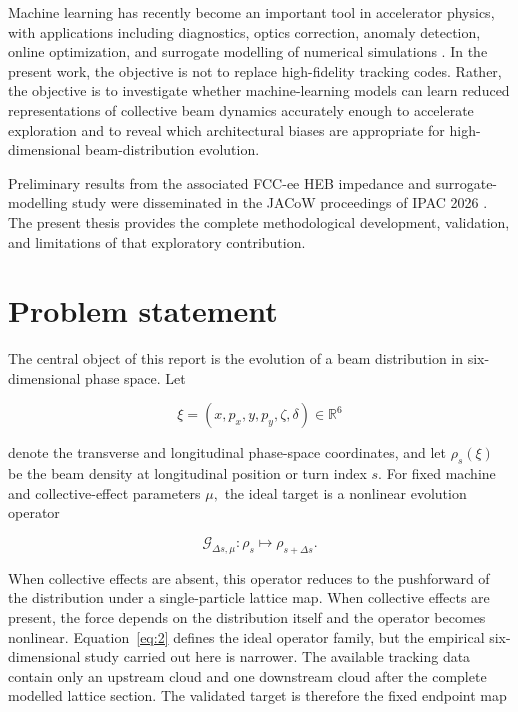 Machine learning has recently become an important tool in accelerator physics, with applications including diagnostics, optics correction, anomaly detection, online optimization, and surrogate modelling of numerical simulations \cite{arpaia2021machine,roussel2024bayesian}. In the present work, the objective is not to replace high-fidelity tracking codes. Rather, the objective is to investigate whether machine-learning models can learn reduced representations of collective beam dynamics accurately enough to accelerate exploration and to reveal which architectural biases are appropriate for high-dimensional beam-distribution evolution.

Preliminary results from the associated FCC-ee HEB impedance and surrogate-modelling study were disseminated in the JACoW proceedings of IPAC 2026 \cite{ghribi2026updates}. The present thesis provides the complete methodological development, validation, and limitations of that exploratory contribution.

\section{Problem statement}
\label{sec:01_introduction_problem_statement}

The central object of this report is the evolution of a beam distribution in six-dimensional phase space. Let

\begin{equation}
\label{eq:1}
\xi=(x,p_x,y,p_y,\zeta,\delta)\in\mathbb{R}^6
\end{equation}

denote the transverse and longitudinal phase-space coordinates, and let \(\rho_{s} ( \xi )\) be the beam density at longitudinal position or turn index \(s .\) For fixed machine and collective-effect parameters \(\mu ,\) the ideal target is a nonlinear evolution operator

\begin{equation}
\label{eq:2}
\mathcal{G}_{\Delta s,\mu}:\rho_s\mapsto\rho_{s+\Delta s}.
\end{equation}

When collective effects are absent, this operator reduces to the pushforward of the distribution under a single-particle lattice map. When collective effects are present, the force depends on the distribution itself and the operator becomes nonlinear. Equation~\eqref{eq:2} defines the ideal operator family, but the empirical six-dimensional study carried out here is narrower. The available tracking data contain only an upstream cloud and one downstream cloud after the complete modelled lattice section. The validated target is therefore the fixed endpoint map

